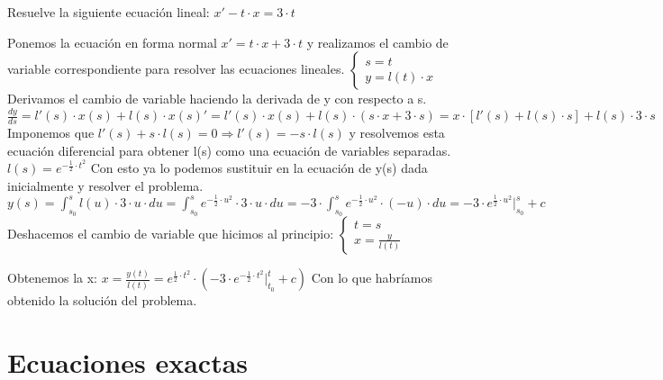 \begin{ejer}
	Resuelve la siguiente ecuación lineal: $x'-t\cdot x = 3\cdot t$
\end{ejer}
\begin{sol}
	Ponemos la ecuación en forma normal $x' = t\cdot x + 3\cdot t$ y realizamos el cambio de variable correspondiente para resolver las ecuaciones lineales.  
	$\begin{cases}
	s = t \\
	y = l(t)\cdot x
	\end{cases}$  
	Derivamos el cambio de variable haciendo la derivada de y con respecto a s.  
	$\frac{dy}{ds} = l'(s)\cdot x(s) + l(s)\cdot x(s)' = l'(s)\cdot x(s) + l(s)\cdot (s\cdot x + 3\cdot s) = x\cdot [l'(s) + l(s)\cdot s] + l(s)\cdot 3\cdot s$  
	Imponemos que $l'(s) + s\cdot l(s) = 0 \Rightarrow l'(s) = -s\cdot l(s)$ y resolvemos esta ecuación diferencial para obtener l(s) como una ecuación de variables separadas.  
	$l(s) = e^{-\frac{1}{2}\cdot t^2}$  
	Con esto ya lo podemos sustituir en la ecuación de y(s) dada inicialmente y resolver el problema.  
	$y(s) = \int_{s_0}^{s}l(u)\cdot 3\cdot u\cdot du = \int_{s_0}^{s}e^{-\frac{1}{2}\cdot u^2}\cdot 3\cdot u\cdot du = -3\cdot \int_{s_0}^{s}e^{-\frac{1}{2}\cdot u^2}\cdot (-u)\cdot du = -3\cdot e^{\frac{1}{2}\cdot u^2} \Big|_{s_0}^{s} + c$  
	Deshacemos el cambio de variable que hicimos al principio:  
	$\begin{cases}
	t=s \\
	x = \frac{y}{l(t)}
	\end{cases}$
	
	Obtenemos la x:  
	$x = \frac{y(t)}{l(t)} = e^{\frac{1}{2}\cdot t^2}\cdot (-3\cdot e^{-\frac{1}{2}\cdot t^2}\Big|_{t_0}^{t} + c)$  
	Con lo que habríamos obtenido la solución del problema.
\end{sol}


\section{Ecuaciones exactas}


